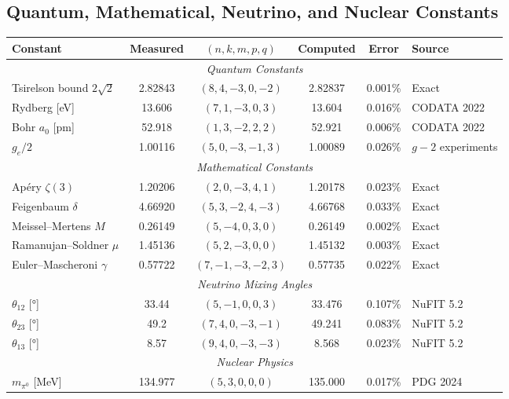 \documentclass[aps,prd,preprint,superscriptaddress,showpacs,nofootinbib,longbibliography]{revtex4-2}
\begin{document}
\subsection{Quantum, Mathematical, Neutrino, and Nuclear Constants}

\begin{table}[t]
\centering
\small
\begin{tabular}{@{}lccccl@{}}
\toprule
\textbf{Constant} & \textbf{Measured} & $(n,k,m,p,q)$ & \textbf{Computed} & \textbf{Error} & \textbf{Source} \\
\midrule
\multicolumn{6}{c}{\textit{Quantum Constants}} \\
Tsirelson bound $2\sqrt{2}$ & 2.82843 & $(8,4,-3,0,-2)$ & 2.82837 & 0.001\% & Exact~\cite{tsirelson1980} \\
Rydberg [\si{eV}] & 13.606 & $(7,1,-3,0,3)$ & 13.604 & 0.016\% & CODATA 2022 \\
Bohr $a_0$ [\si{pm}] & 52.918 & $(1,3,-2,2,2)$ & 52.921 & 0.006\% & CODATA 2022 \\
$g_e/2$ & 1.00116 & $(5,0,-3,-1,3)$ & 1.00089 & 0.026\% & $g-2$ experiments \\
\midrule
\multicolumn{6}{c}{\textit{Mathematical Constants}} \\
Ap\'{e}ry $\zeta(3)$ & 1.20206 & $(2,0,-3,4,1)$ & 1.20178 & 0.023\% & Exact \\
Feigenbaum $\delta$ & 4.66920 & $(5,3,-2,4,-3)$ & 4.66768 & 0.033\% & Exact \\
Meissel--Mertens $M$ & 0.26149 & $(5,-4,0,3,0)$ & 0.26149 & 0.002\% & Exact \\
Ramanujan--Soldner $\mu$ & 1.45136 & $(5,2,-3,0,0)$ & 1.45132 & 0.003\% & Exact \\
Euler--Mascheroni $\gamma$ & 0.57722 & $(7,-1,-3,-2,3)$ & 0.57735 & 0.022\% & Exact \\
\midrule
\multicolumn{6}{c}{\textit{Neutrino Mixing Angles}} \\
$\theta_{12}$ [\si{\degree}] & 33.44 & $(5,-1,0,0,3)$ & 33.476 & 0.107\% & NuFIT 5.2~\cite{nufit2022} \\
$\theta_{23}$ [\si{\degree}] & 49.2 & $(7,4,0,-3,-1)$ & 49.241 & 0.083\% & NuFIT 5.2 \\
$\theta_{13}$ [\si{\degree}] & 8.57 & $(9,4,0,-3,-3)$ & 8.568 & 0.023\% & NuFIT 5.2 \\
\midrule
\multicolumn{6}{c}{\textit{Nuclear Physics}} \\
$m_{\pi^0}$ [\si{MeV}] & 134.977 & $(5,3,0,0,0)$ & 135.000 & 0.017\% & PDG 2024~\cite{pdg2024} \\

\end{tabular}
\end{table}
\end{document}
